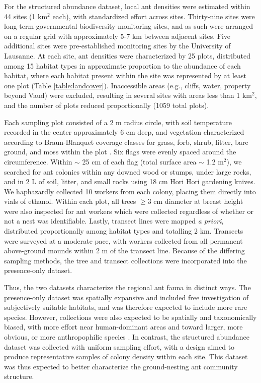 \documentclass[preprint,final,times,12pt,3p]{elsarticle}
\begin{document}
For the structured abundance dataset, local ant densities were estimated within 44 sites (1 km$^2$ each), with standardized effort across sites. Thirty-nine sites were long-term governmental biodiversity monitoring sites, and as such were arranged on a regular grid with approximately 5-7 km between adjacent sites. Five additional sites were pre-established monitoring sites by the University of Lausanne. At each site, ant densities were characterized by 25 plots, distributed among 15 habitat types \citep{Gago-Silva2017} in approximate proportion to the abundance of each habitat, where each habitat present within the site was represented by at least one plot (Table \ref{table:landcover}). Inaccessible areas (e.g., cliffs, water, property beyond Vaud) were excluded, resulting in several sites with areas less than 1 km$^2$, and the number of plots reduced proportionally (1059 total plots). 

Each sampling plot consisted of a 2 m radius circle, with soil temperature recorded in the center approximately 6 cm deep, and vegetation characterized according to Braun-Blanquet coverage classes for grass, forb, shrub, litter, bare ground, and moss within the plot \citep{Douglas1978}. Six flags were evenly spaced around the circumference. Within $\sim$ 25 cm of each flag (total surface area $\sim$ 1.2 m$^2$), we searched for ant colonies within any downed wood or stumps, under large rocks, and in 2 L of soil, litter, and small rocks using 18 cm Hori Hori gardening knives. We haphazardly collected 10 workers from each colony, placing them directly into vials of ethanol. Within each plot, all trees $\geq$3 cm diameter at breast height were also inspected for ant workers which were collected regardless of whether or not a nest was identifiable. Lastly, transect lines were mapped \emph{a priori}, distributed proportionally among habitat types and totalling 2 km. Transects were surveyed at a moderate pace, with workers collected from all permanent above-ground mounds within 2 m of the transect line. Because of the differing sampling methods, the tree and transect collections were incorporated into the presence-only dataset. 

Thus, the two datasets characterize the regional ant fauna in distinct ways. The presence-only dataset was spatially expansive and included free investigation of subjectively suitable habitats, and was therefore expected to include more rare species. However, collections were also expected to be spatially and taxonomically biased, with more effort near human-dominant areas and toward larger, more obvious, or more anthropophilic species \citep{Ward2014, Troudet2017}. In contrast, the structured abundance dataset was collected with uniform sampling effort, with a design aimed to produce representative samples of colony density within each site. This dataset was thus expected to better characterize the ground-nesting ant community structure. 
\end{document}
